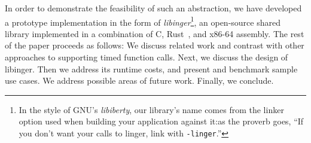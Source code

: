 


In order to demonstrate the feasibility of such an abstraction, we have developed a
prototype implementation in the form of \textit{libinger}\footnote{In the style of
GNU's \textit{libiberty}, our library's name comes from the linker option used when
building your application against it:\@ as the proverb goes, ``If you don't want your
calls to linger, link with \texttt{-linger}.''}, an open-source shared library
implemented in a combination of C, Rust~\cite{www-rustlang}, and x86-64 assembly.
The rest of the paper proceeds as follows:  We discuss related work and contrast with
other approaches to supporting timed function calls.  Next, we discuss the design of
libinger.  Then we address its runtime costs, and present and benchmark sample use
cases.  We address possible areas of future work.  Finally, we conclude.




